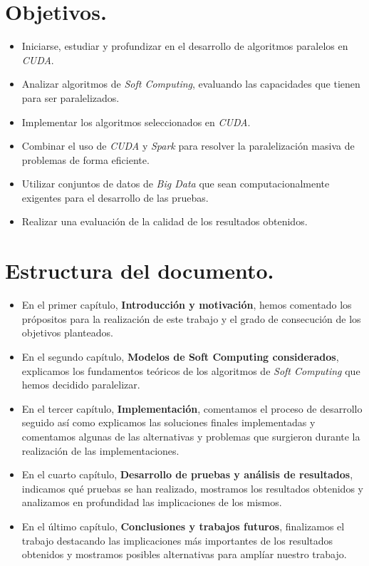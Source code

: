 \documentclass[a4paper,11pt]{book}
\begin{document}
\section{Objetivos.}
\begin{itemize}
    \item Iniciarse, estudiar y profundizar en el desarrollo de algoritmos paralelos en \textit{CUDA}.
    \item Analizar algoritmos de \textit{Soft Computing}, evaluando las capacidades que tienen para ser paralelizados.
    \item Implementar los algoritmos seleccionados en \textit{CUDA}.
    \item Combinar el uso de \textit{CUDA} y \textit{Spark} para resolver la paralelización masiva de problemas de forma eficiente.
    \item Utilizar conjuntos de datos de \textit{Big Data} que sean computacionalmente exigentes para el desarrollo de las pruebas.
    \item Realizar una evaluación de la calidad de los resultados obtenidos.
\end{itemize}

\section{Estructura del documento.}

\begin{itemize}
    \item En el primer capítulo, \textbf{Introducción y motivación}, hemos comentado los própositos para la realización de este trabajo y el grado de consecución de los objetivos planteados.
    \item En el segundo capítulo, \textbf{Modelos de Soft Computing considerados}, explicamos los fundamentos teóricos de los algoritmos de \textit{Soft Computing} que hemos decidido paralelizar.
    \item En el tercer capítulo, \textbf{Implementación}, comentamos el proceso de desarrollo seguido así como explicamos las soluciones finales implementadas y comentamos algunas de las alternativas y problemas que surgieron durante la realización de las implementaciones.
    \item En el cuarto capítulo, \textbf{Desarrollo de pruebas y análisis de resultados}, indicamos qué pruebas se han realizado, mostramos los resultados obtenidos y analizamos en profundidad las implicaciones de los mismos.
    \item En el último capítulo, \textbf{Conclusiones y trabajos futuros}, finalizamos el trabajo destacando las implicaciones más importantes de los resultados obtenidos y mostramos posibles alternativas para amplíar nuestro trabajo.
\end{itemize}
\end{document}

